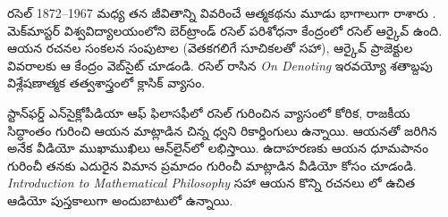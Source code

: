 \documentclass[../../../include/open-logic-section]{subfiles}
\begin{document}
\begin{reading}
రసెల్ 1872--1967 మధ్య తన జీవితాన్ని వివరించే ఆత్మకథను మూడు భాగాలుగా రాశారు \citep{Russell1967,Russell1968,Russell1969}. మెక్‌మాస్టర్ విశ్వవిద్యాలయంలోని బెర్‌ట్రాండ్ రసెల్ పరిశోధనా కేంద్రంలో రసెల్ ఆర్కైవ్ ఉంది. ఆయన రచనల సంకలన సంపుటాల (వెతకగలిగే సూచికలతో సహా), ఆర్కైవ్ ప్రాజెక్టుల వివరాలకు ఆ కేంద్రం వెబ్‌సైట్ \citet{Duncan2015} చూడండి. రసెల్ రాసిన \emph{On
  Denoting} \citep{Russell1905} ఇరవయ్యో శతాబ్దపు విశ్లేషణాత్మక తత్వశాస్త్రంలో క్లాసిక్ వ్యాసం.

స్టాన్‌ఫర్డ్ ఎన్‌సైక్లోపీడియా ఆఫ్ ఫిలాసఫీలో రసెల్ గురించిన వ్యాసంలో \citep{Irvine2015} కోరిక, రాజకీయ సిద్ధాంతం గురించి ఆయన మాట్లాడిన చిన్న ధ్వని రికార్డింగులు ఉన్నాయి. ఆయనతో జరిగిన అనేక వీడియో ముఖాముఖిలు ఆన్‌లైన్‌లో లభిస్తాయి. ఉదాహరణకు ఆయన ధూమపానం గురించీ తనకు ఎదురైన విమాన ప్రమాదం గురించీ మాట్లాడిన వీడియో కోసం \citet{RussellND} చూడండి. \emph{Introduction to Mathematical Philosophy} సహా ఆయన కొన్ని రచనలు \citet{LibriVoxND}లో ఉచిత ఆడియో పుస్తకాలుగా అందుబాటులో ఉన్నాయి.
\end{reading}
\end{document}
